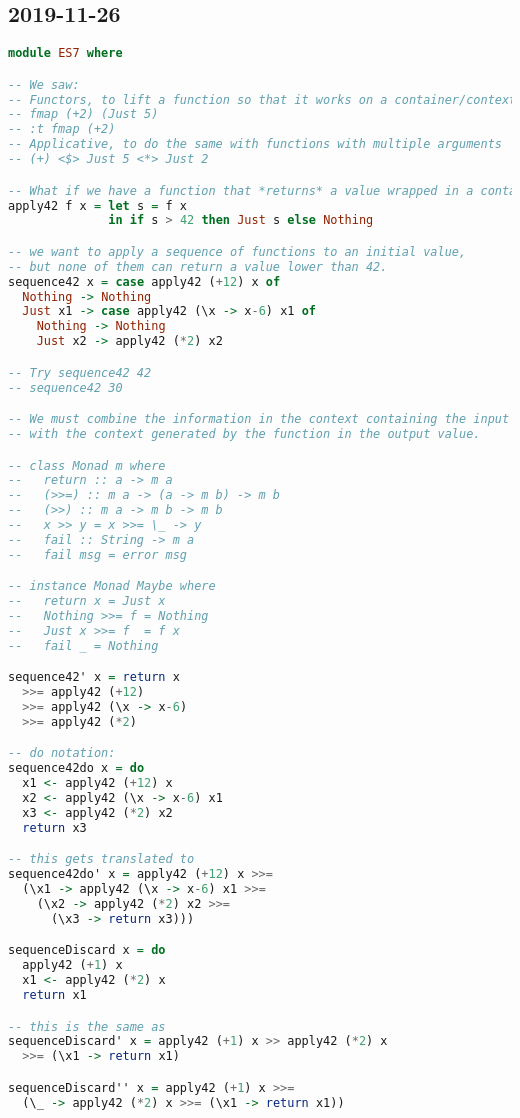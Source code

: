 \subsection{2019-11-26}
\begin{lstlisting}[language=Haskell]
module ES7 where

-- We saw:
-- Functors, to lift a function so that it works on a container/context
-- fmap (+2) (Just 5)
-- :t fmap (+2)
-- Applicative, to do the same with functions with multiple arguments
-- (+) <$> Just 5 <*> Just 2

-- What if we have a function that *returns* a value wrapped in a container/context?
apply42 f x = let s = f x
              in if s > 42 then Just s else Nothing

-- we want to apply a sequence of functions to an initial value,
-- but none of them can return a value lower than 42.
sequence42 x = case apply42 (+12) x of
  Nothing -> Nothing
  Just x1 -> case apply42 (\x -> x-6) x1 of
    Nothing -> Nothing
    Just x2 -> apply42 (*2) x2

-- Try sequence42 42
-- sequence42 30

-- We must combine the information in the context containing the input value
-- with the context generated by the function in the output value.

-- class Monad m where
--   return :: a -> m a
--   (>>=) :: m a -> (a -> m b) -> m b
--   (>>) :: m a -> m b -> m b
--   x >> y = x >>= \_ -> y
--   fail :: String -> m a
--   fail msg = error msg

-- instance Monad Maybe where
--   return x = Just x
--   Nothing >>= f = Nothing
--   Just x >>= f  = f x
--   fail _ = Nothing

sequence42' x = return x
  >>= apply42 (+12)
  >>= apply42 (\x -> x-6)
  >>= apply42 (*2)

-- do notation:
sequence42do x = do
  x1 <- apply42 (+12) x
  x2 <- apply42 (\x -> x-6) x1
  x3 <- apply42 (*2) x2
  return x3

-- this gets translated to
sequence42do' x = apply42 (+12) x >>=
  (\x1 -> apply42 (\x -> x-6) x1 >>=
    (\x2 -> apply42 (*2) x2 >>=
      (\x3 -> return x3)))

sequenceDiscard x = do
  apply42 (+1) x
  x1 <- apply42 (*2) x
  return x1

-- this is the same as
sequenceDiscard' x = apply42 (+1) x >> apply42 (*2) x
  >>= (\x1 -> return x1)

sequenceDiscard'' x = apply42 (+1) x >>=
  (\_ -> apply42 (*2) x >>= (\x1 -> return x1))


\end{lstlisting}
